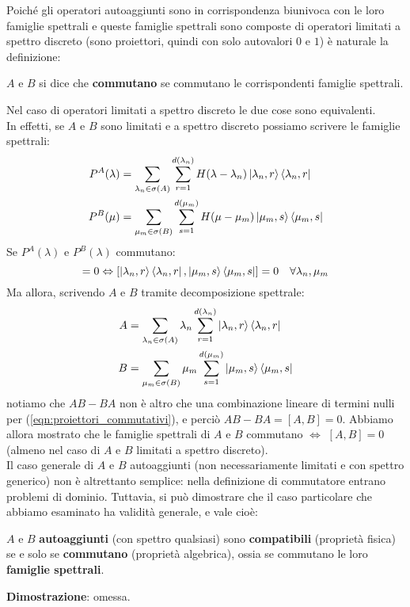 \documentclass[../../FisicaTeorica.tex]{subfiles}
\begin{document}
Poiché gli operatori autoaggiunti sono in corrispondenza biunivoca con le loro famiglie spettrali e queste famiglie spettrali sono composte di operatori limitati a spettro discreto (sono proiettori, quindi con solo autovalori $0$ e $1$) è naturale la definizione:

\begin{dfn}
$A$ e $B$ si dice che \textbf{commutano} se commutano le corrispondenti famiglie spettrali. 
\end{dfn}
Nel caso di operatori limitati a spettro discreto le due cose sono equivalenti.\\
In effetti, se $A$ e $B$ sono limitati e a spettro discreto possiamo scrivere le famiglie spettrali:
\begin{align*}
P^A(\lambda) &= \sum_{\lambda_n \in \sigma(A)}\sum_{r=1}^{d(\lambda_n)}H(\lambda-\lambda_n)\Ket{\lambda_n,r}\Bra{\lambda_n, r}\\
P^B(\mu) &= \sum_{\mu_m \in \sigma(B)}\sum_{s=1}^{d(\mu_m)}H(\mu-\mu_m)\Ket{\mu_m, s}\Bra{\mu_m, s}
\end{align*}
Se $P^A(\lambda)$ e $P^B(\lambda)$ commutano:
\begin{equation}
[P^A(\lambda), P^B(\mu)]=0 \Leftrightarrow [\ket{\lambda_n,r}\bra{\lambda_n, r}, \ket{\mu_m, s}\bra{\mu_m, s}] = 0 \quad \forall \lambda_n, \mu_m 
\label{eqn:proiettori_commutativi}
\end{equation}
Ma allora, scrivendo $A$ e $B$ tramite decomposizione spettrale:
\begin{align*}
A &= \sum_{\lambda_n \in \sigma(A)}\lambda_n \sum_{r=1}^{d(\lambda_n)}\Ket{\lambda_n,r}\Bra{\lambda_n,r}\\
B &= \sum_{\mu_m \in \sigma(B)} \mu_m \sum_{s=1}^{d(\mu_m)}\Ket{\mu_m, s}\Bra{\mu_m, s}
\end{align*}
notiamo che $AB-BA$ non è altro che una combinazione lineare di termini nulli per (\ref{eqn:proiettori_commutativi}), e perciò $AB-BA=[A,B]=0$. Abbiamo allora mostrato che le famiglie spettrali di $A$ e $B$ commutano $\Leftrightarrow$ $[A,B]=0$ (almeno nel caso di $A$ e $B$ limitati a spettro discreto).\\

Il caso generale di $A$ e $B$ autoaggiunti (non necessariamente limitati e con spettro generico) non è altrettanto semplice: nella definizione di commutatore entrano problemi di dominio. Tuttavia, si può dimostrare che il caso particolare che abbiamo esaminato ha validità generale, e vale cioè:
 \begin{thm}
 $A$ e $B$ \textbf{autoaggiunti} (con spettro qualsiasi) sono \textbf{compatibili} (proprietà fisica) se e solo se \textbf{commutano} (proprietà algebrica), ossia se commutano le loro \textbf{famiglie spettrali}.
\label{thm:compatibility}
 \end{thm}
 
 \textbf{Dimostrazione}: omessa.

\begin{comment}
 Nella prossima lezione ci concentreremo sull'analizzare le caratteristiche di un insieme massimale su cui sono definite coppie di operatori.
\end{comment}
\end{document}
